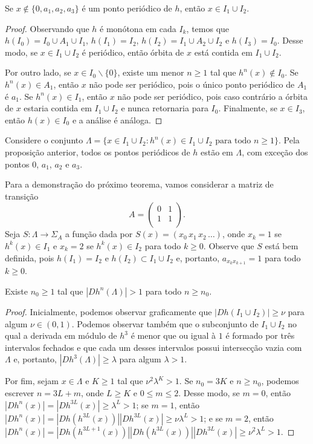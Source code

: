 \begin{proposition}
Se $x \notin \lbrace 0, a_1, a_2, a_3 \rbrace$ é um ponto periódico de $h$, então $x \in I_1 \cup I_2$.
\end{proposition}

\begin{proof}
Observando que $h$ é monótona em cada $I_k$, temos que $h(I_0) = I_0 \cup A_1 \cup I_1$, $h(I_1) = I_2$, $h(I_2) = I_1 \cup A_2 \cup I_2$ e $h(I_3) = I_0$. Desse modo, se $x \in I_1 \cup I_2$ é periódico, então órbita de $x$ está contida em $I_1 \cup I_2$.

Por outro lado, se $x \in I_0 \backslash \lbrace 0 \rbrace$, existe um menor $n \geq 1$ tal que $h^n(x) \notin I_0$. Se $h^n(x) \in A_1$, então $x$ não pode ser periódico, pois o único ponto periódico de $A_1$ é $a_1$.
Se $h^n(x) \in I_1$, então $x$ não pode ser periódico, pois caso contrário a órbita de $x$ estaria contida em $I_1 \cup I_2$ e nunca retornaria para $I_0$.
Finalmente, se $x \in I_3$, então $h(x) \in I_0$ e a análise é análoga.
\end{proof}

Considere o conjunto $\Lambda = \lbrace x \in I_1 \cup I_2 : h^n(x) \in I_1 \cup I_2 \text{ para todo } n \geq 1 \rbrace$.
Pela proposição anterior, todos os pontos periódicos de $h$ estão em $\Lambda$, com exceção dos pontos $0$, $a_1$, $a_2$ e $a_3$.

Para a demonstração do próximo teorema, vamos considerar a matriz de transição
$$A =
\begin{pmatrix}
0 & 1 \\
1 & 1 \\
\end{pmatrix}.$$
Seja $S: \Lambda \to \Sigma_A$ a função dada por $S(x) = (x_0 \, x_1 \, x_2 \, \dots)$, onde $x_k = 1$ se $h^k(x) \in I_1$ e $x_k = 2$ se $h^k(x) \in I_2$ para todo $k \geq 0$. Observe que $S$ está bem definida, pois $h(I_1) = I_2$ e $h(I_2) \subset I_1 \cup I_2$ e, portanto, $a_{x_k x_{k+1}} = 1$ para todo $k \geq 0$. 


\begin{lemma}
Existe $n_0 \geq 1$ tal que $|D h^n(\Lambda)| > 1$ para todo $n \geq n_0$.
\end{lemma}

\begin{proof}
Inicialmente, podemos observar graficamente que $|D h(I_1 \cup I_2)| \geq \nu$ para algum $\nu \in (0, 1)$.
Podemos observar também que o subconjunto de $I_1 \cup I_2$ no qual a derivada em módulo de $h^3$ é menor que ou igual à $1$ é formado por três intervalos fechados e que cada um desses intervalos possui intersecção vazia com $\Lambda$ e, portanto, $|D h^3(\Lambda)| \geq \lambda$ para algum $\lambda > 1$.

Por fim, sejam $x \in \Lambda$ e $K \geq 1$ tal que $\nu^2 \lambda^K > 1$. Se $n_0 = 3K$ e $n \geq n_0$, podemos escrever $n = 3L + m$, onde $L \geq K$ e $0 \leq m \leq 2$. Desse modo, se $m = 0$, então $ |D h^n(x)| = |D h^{3L}(x)|
\geq \lambda^L > 1$; se $m = 1$, então $|D h^n(x)| = |D h(h^{3L}(x))| |D h^{3L}(x)| \geq \nu \lambda^L > 1$; e se $m = 2$, então $|D h^n(x)| = |D h(h^{3L+1}(x))| |D h(h^{3L}(x))| |D h^{3L}(x)| \geq \nu^2 \lambda^L > 1$.
\end{proof}

